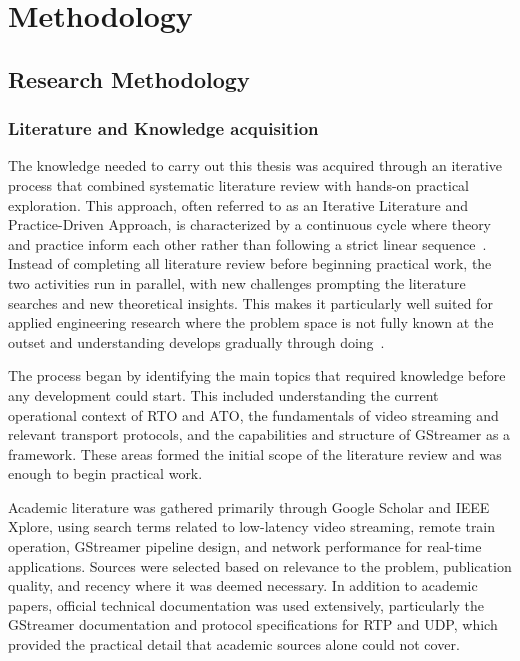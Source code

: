 \section{Methodology}\label{sec:methodology}

\subsection{Research Methodology}

\subsubsection{Literature and Knowledge acquisition}
The knowledge needed to carry out this thesis was acquired through an iterative process that combined systematic literature review with hands-on practical exploration. This approach, often referred to as an Iterative Literature and Practice-Driven Approach, is characterized by a continuous cycle where theory and practice inform each other rather than following a strict linear sequence~\cite{wohlin2012}. Instead of completing all literature review before beginning practical work, the two activities run in parallel, with new challenges prompting the literature searches and new theoretical insights. This makes it particularly well suited for applied engineering research where the problem space is not fully known at the outset and understanding develops gradually through doing~\cite{hevner2004, saunders2019}.

The process began by identifying the main topics that required knowledge before any development could start. This included understanding the current operational context of RTO and ATO, the fundamentals of video streaming and relevant transport protocols, and the capabilities and structure of GStreamer as a framework. These areas formed the initial scope of the literature review and was enough to begin practical work.

Academic literature was gathered primarily through Google Scholar and IEEE Xplore, using search terms related to low-latency video streaming, remote train operation, GStreamer pipeline design, and network performance for real-time applications. Sources were selected based on relevance to the problem, publication quality, and recency where it was deemed necessary. In addition to academic papers, official technical documentation was used extensively, particularly the GStreamer documentation and protocol specifications for RTP and UDP, which provided the practical detail that academic sources alone could not cover.

